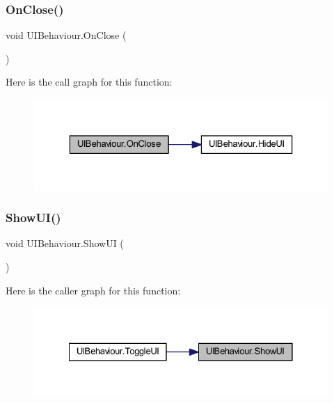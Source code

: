 \subsubsection{\texorpdfstring{OnClose()}{OnClose()}}
{\footnotesize\ttfamily void U\+I\+Behaviour.\+On\+Close (\begin{DoxyParamCaption}{ }\end{DoxyParamCaption})}

Here is the call graph for this function\+:\nopagebreak
\begin{figure}[H]
\begin{center}
\leavevmode
\includegraphics[width=323pt]{class_u_i_behaviour_a058150104cbc5deee5bb2d2c8811380a_cgraph}
\end{center}
\end{figure}
\mbox{\label{class_u_i_behaviour_a14585d2d40b493d7999564d8a51d51c5}} 
\subsubsection{\texorpdfstring{ShowUI()}{ShowUI()}}
{\footnotesize\ttfamily void U\+I\+Behaviour.\+Show\+UI (\begin{DoxyParamCaption}{ }\end{DoxyParamCaption})}

Here is the caller graph for this function\+:\nopagebreak
\begin{figure}[H]
\begin{center}
\leavevmode
\includegraphics[width=328pt]{class_u_i_behaviour_a14585d2d40b493d7999564d8a51d51c5_icgraph}
\end{center}
\end{figure}
\mbox{\label{class_u_i_behaviour_a508b07927b86c1f75ab1eeb45674f040}} 
